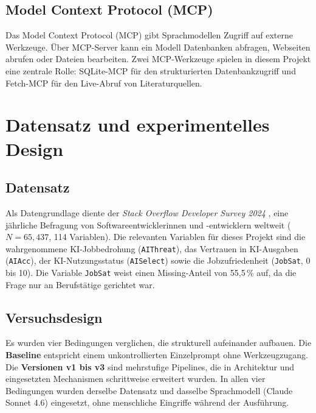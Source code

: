 \documentclass[11pt,a4paper]{article}
\begin{document}
\subsection{Model Context Protocol (MCP)}

Das Model Context Protocol (MCP) \cite{anthropic2025mcp} gibt Sprachmodellen Zugriff
auf externe Werkzeuge. Über MCP-Server kann ein Modell Datenbanken abfragen,
Webseiten abrufen oder Dateien bearbeiten. Zwei
MCP-Werkzeuge spielen in diesem Projekt eine zentrale Rolle: SQLite-MCP für den
strukturierten Datenbankzugriff und Fetch-MCP für den Live-Abruf von Literaturquellen.

\section{Datensatz und experimentelles Design}

\subsection{Datensatz}

Als Datengrundlage diente der \emph{Stack Overflow Developer Survey 2024}
\cite{stackoverflow2024}, eine jährliche Befragung von Softwareentwicklerinnen
und -entwicklern weltweit ($N = 65{,}437$, 114 Variablen). Die relevanten
Variablen für dieses Projekt sind die wahrgenommene KI-Jobbedrohung
(\texttt{AIThreat}), das Vertrauen in KI-Ausgaben (\texttt{AIAcc}), der
KI-Nutzungsstatus (\texttt{AISelect}) sowie die Jobzufriedenheit
(\texttt{JobSat}, 0 bis 10). Die Variable \texttt{JobSat} weist einen Missing-Anteil
von 55{,}5\,\% auf, da die Frage nur an Berufstätige gerichtet war.

\subsection{Versuchsdesign}

Es wurden vier Bedingungen verglichen, die strukturell aufeinander aufbauen.
Die \textbf{Baseline} entspricht einem unkontrollierten Einzelprompt ohne
Werkzeugzugang. Die \textbf{Versionen v1 bis v3} sind mehrstufige Pipelines,
die in Architektur und eingesetzten Mechanismen schrittweise erweitert wurden.
In allen vier Bedingungen wurden derselbe Datensatz und dasselbe Sprachmodell
(Claude Sonnet 4.6) eingesetzt, ohne menschliche Eingriffe während der Ausführung.
\end{document}
